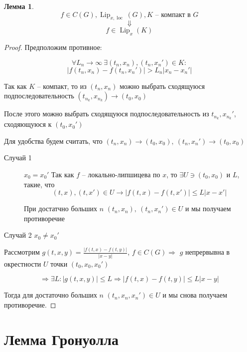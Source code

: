 \documentclass[a4paper]{article}
\theoremstyle{indented}
\newtheorem*{lemma}{Лемма}
\theoremstyle{definition}
\theoremstyle{remark}
\DeclareMathOperator{\Lip}{Lip}
\DeclareMathOperator{\loc}{loc}
\begin{document}
\begin{lemma}
  \[f \in C(G), \Lip_{x,\loc}(G), K \text{ -- компакт в } G\]
  \[\Downarrow \]
  \[f \in \Lip_x(K)\]
\end{lemma}
\begin{proof}
  Предположим противное:

  \[\forall L_n \to \infty \ \exists (t_n,x_n), (t_n, x_n') \in K:\]
  \[|f(t_n,x_n) - f(t_n,x_n') | > L_n |x_n - x_n'|\]

  Так как $K$ -- компакт, то из $(t_n,x_n)$ можно выбрать сходящуюся подпоследовательность $(t_{n_k},x_{n_k}) \to (t_0, x_0)$

  После этого можно выбрать сходящуюся подпоследовательность из $t_{n_k}, x_{n_k}'$, сходяющуюся к $(t_0,x_0')$

  Для удобства будем считать, что $(t_n,x_n) \to (t_0,x_0), \ (t_n,x_n') \to (t_0,x_0)$
  \begin{description}
  \item[Случай 1] $x_0 = x_0'$
    Так как $f$ -- локально-липшицева по $x$, то $\exists U \ni (t_0,x_0)$ и $L$, такие, что
    \[(t,x), (t,x') \in U  \to |f(t,x) - f(t,x')| \leqslant L|x - x'|\]

    При достатчно больших $n$ $(t_n,x_n), \ (t_n,x_n') \in U$ и мы получаем противоречие
  \end{description}
\item[Случай 2] $x_0 \neq x_0'$

  Рассмотрим $g(t,x,y) = \frac{|f(t,x) - f(t,y)|}{|x-y|} $, $f \in C(G) \Rightarrow $ $g$ непрервывна в окрестности $U$ точки $(t_0,x_0,x_0')$

  \[\Rightarrow \exists L : |g(t,x,y)| \leqslant L \Rightarrow |f(t,x) - f(t,y)| \leqslant L|x-y|\]
  
  Тогда для достаточно больших $n$ $(t_n,x_n,x_n') \in U$ и мы снова получаем противоречие.
  
\end{proof}

\section{Лемма Гронуолла}
\end{document}

